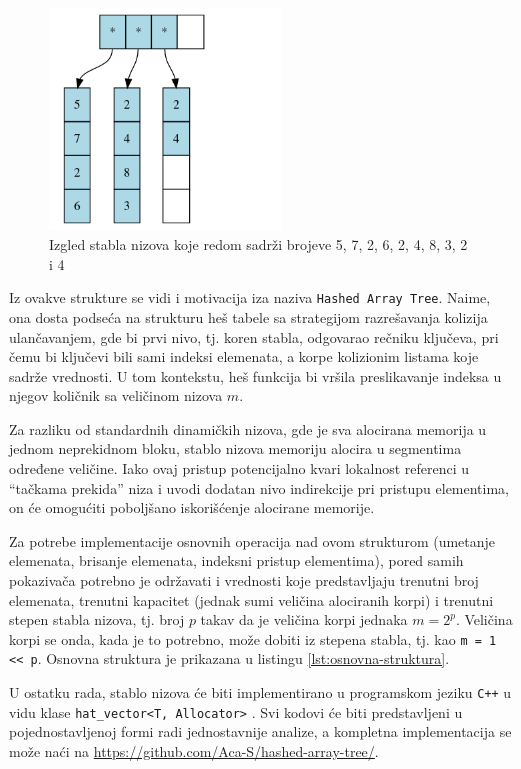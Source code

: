 \documentclass[a4paper]{article}
\begin{document}
\begin{figure}[h!]
    \centering
    \includegraphics[width=0.55\textwidth]{ilustracije/hat-struktura-primer.png}
    \caption{Izgled stabla nizova koje redom sadrži brojeve 5, 7, 2, 6, 2, 4, 8, 3, 2 i 4}
    \label{fig:hat-struktura-primer}
\end{figure}

Iz ovakve strukture se vidi i motivacija iza naziva \verb|Hashed Array Tree|. Naime, ona dosta podseća na strukturu heš tabele sa strategijom razrešavanja kolizija ulančavanjem, gde bi prvi nivo, tj. koren stabla, odgovarao rečniku ključeva, pri čemu bi ključevi bili sami indeksi elemenata, a korpe kolizionim listama koje sadrže vrednosti. U tom kontekstu, heš funkcija bi vršila preslikavanje indeksa u njegov količnik sa veličinom nizova $m$.

Za razliku od standardnih dinamičkih nizova, gde je sva alocirana memorija u jednom neprekidnom bloku, stablo nizova memoriju alocira u segmentima određene veličine. Iako ovaj pristup potencijalno kvari lokalnost referenci u \enquote{tačkama prekida} niza i uvodi dodatan nivo indirekcije pri pristupu elementima, on će omogućiti poboljšano iskorišćenje alocirane memorije.

Za potrebe implementacije osnovnih operacija nad ovom strukturom (umetanje elemenata, brisanje elemenata, indeksni pristup elementima), pored samih pokazivača potrebno je održavati i vrednosti koje predstavljaju trenutni broj elemenata, trenutni kapacitet (jednak sumi veličina alociranih korpi) i trenutni stepen stabla nizova, tj. broj $p$ takav da je veličina korpi jednaka $m = 2^p$. Veličina korpi se onda, kada je to potrebno, može dobiti iz stepena stabla, tj. kao \verb|m = 1 << p|. Osnovna struktura je prikazana u listingu \ref{lst:osnovna-struktura}.

U ostatku rada, stablo nizova će biti implementirano u programskom jeziku \verb|C++| u vidu klase \verb|hat_vector<T, Allocator>| \cite{hat-implementation}. Svi kodovi će biti predstavljeni u pojednostavljenoj formi radi jednostavnije analize, a kompletna implementacija se može naći na \url{https://github.com/Aca-S/hashed-array-tree/}.
\end{document}
